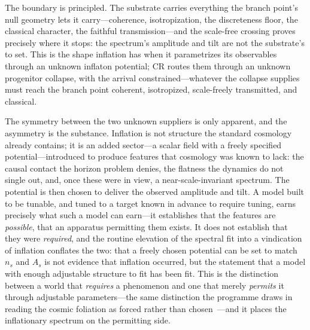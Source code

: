 \documentclass[11pt,a4paper]{article}
\theoremstyle{plain}
\theoremstyle{definition}
\theoremstyle{remark}
\begin{document}
The boundary is principled. The substrate carries everything the branch point's null geometry lets it carry---coherence, isotropization, the discreteness floor, the classical character, the faithful transmission---and the scale-free crossing proves precisely where it stops: the spectrum's amplitude and tilt are not the substrate's to set. This is the shape inflation has when it parametrizes its observables through an unknown inflaton potential; CR routes them through an unknown progenitor collapse, with the arrival constrained---whatever the collapse supplies must reach the branch point coherent, isotropized, scale-freely transmitted, and classical.

The symmetry between the two unknown suppliers is only apparent, and the asymmetry is the substance. Inflation is not structure the standard cosmology already contains; it is an added sector---a scalar field with a freely specified potential---introduced to produce features that cosmology was known to lack: the causal contact the horizon problem denies, the flatness the dynamics do not single out, and, once these were in view, a near-scale-invariant spectrum. The potential is then chosen to deliver the observed amplitude and tilt. A model built to be tunable, and tuned to a target known in advance to require tuning, earns precisely what such a model can earn---it establishes that the features are \emph{possible}, that an apparatus permitting them exists. It does not establish that they were \emph{required}, and the routine elevation of the spectral fit into a vindication of inflation conflates the two: that a freely chosen potential can be set to match $n_s$ and $A_s$ is not evidence that inflation occurred, but the statement that a model with enough adjustable structure to fit has been fit. This is the distinction between a world that \emph{requires} a phenomenon and one that merely \emph{permits} it through adjustable parameters---the same distinction the programme draws in reading the cosmic foliation as forced rather than chosen~\cite{JanzenModernParallax}---and it places the inflationary spectrum on the permitting side.
\end{document}
